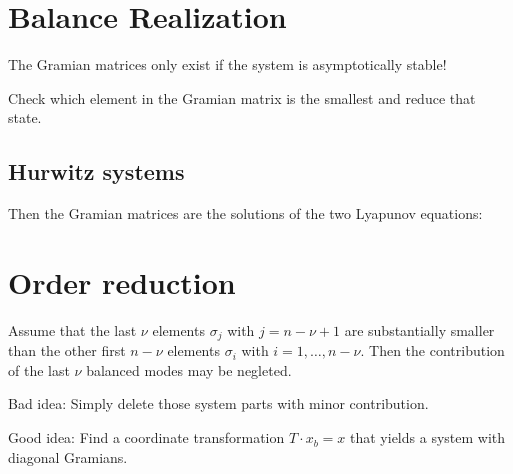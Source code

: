 \documentclass[10pt,a4paper]{scrartcl}
\begin{document}
\begin{multicols*}{3}
\section{Balance Realization}

The Gramian matrices only exist if the system is asymptotically stable!





\dahe Check which element in the Gramian matrix is the smallest and reduce that state.

\subsection{Hurwitz systems}


Then the Gramian matrices are the solutions of the two Lyapunov equations:


\vfill

\null

\columnbreak

\section{Order reduction}

Assume that the last $\nu$ elements $\sigma_j$ with $j=n-\nu+1$ are substantially smaller than the other first $n-\nu$ elements $\sigma_i$ with $i=1,\ldots, n-\nu$. Then the contribution of the last $\nu$ balanced modes may be negleted.

\finn

Bad idea: Simply delete those system parts with minor contribution.

\finn

Good idea: Find a coordinate transformation $T\cdot x_b=x$ that yields a system with diagonal Gramians.


\end{multicols*}
\end{document}
